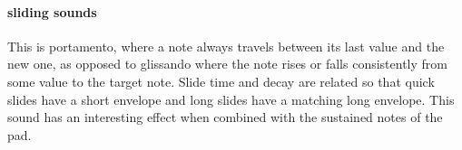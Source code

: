\paragraph{sliding sounds}
This is portamento, where a note always travels
between its last value and the new one, as opposed to
glissando where the note rises or falls consistently
from some value to the target note.
Slide time and decay are related so that
quick slides have a short envelope and long slides have a matching
long envelope. This sound has an interesting effect when combined
with the sustained notes of the pad.